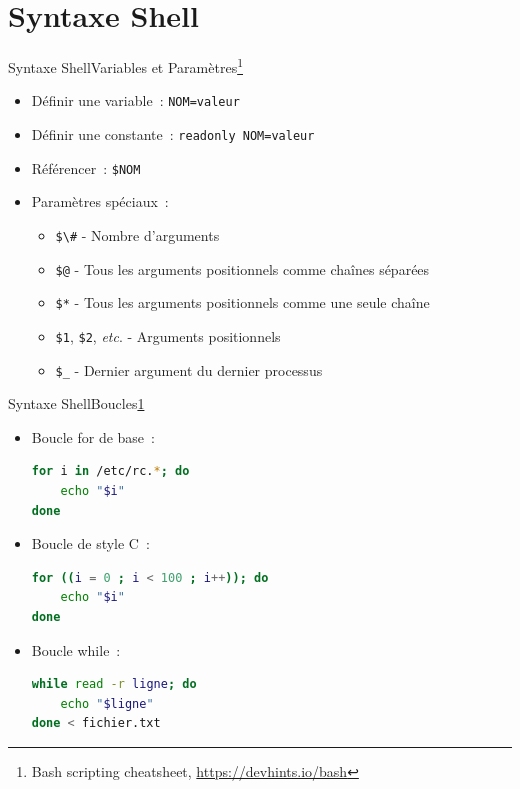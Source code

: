 \documentclass{beamer}
\begin{document}
    \section{Syntaxe Shell}\label{sec:syntaxe-shell}

    \begin{frame}{Syntaxe Shell}{Variables et Paramètres\footnote{\label{devhint-bash}Bash scripting cheatsheet, \url{https://devhints.io/bash}}}
        \bigbreak
        \begin{itemize}
            \item Définir une variable~: \lstinline{NOM=valeur}
            \item Définir une constante~: \lstinline{readonly NOM=valeur}
            \item Référencer~: \lstinline{$NOM}
            \item Paramètres spéciaux~:
            \begin{itemize}
                \item \lstinline{$\#} - Nombre d'arguments
                \item \lstinline{$@} - Tous les arguments positionnels comme chaînes séparées
                \item \lstinline{$*} - Tous les arguments positionnels comme une seule chaîne
                \item \lstinline{$1}, \lstinline{$2}, \textit{etc}. - Arguments positionnels
                \item \lstinline{$_} - Dernier argument du dernier processus
            \end{itemize}
        \end{itemize}
    \end{frame}

    \begin{frame}[fragile]{Syntaxe Shell}{Boucles\cref{devhint-bash}}
        \begin{itemize}
            \item Boucle for de base~:
            \begin{lstlisting}[language=bash]
for i in /etc/rc.*; do
    echo "$i"
done
            \end{lstlisting}
            \item Boucle de style C~:
            \begin{lstlisting}[language=bash]
for ((i = 0 ; i < 100 ; i++)); do
    echo "$i"
done
            \end{lstlisting}
            \item Boucle while~:
            \begin{lstlisting}[language=bash]
while read -r ligne; do
    echo "$ligne"
done < fichier.txt
            \end{lstlisting}
        \end{itemize}
    \end{frame}
\end{document}
